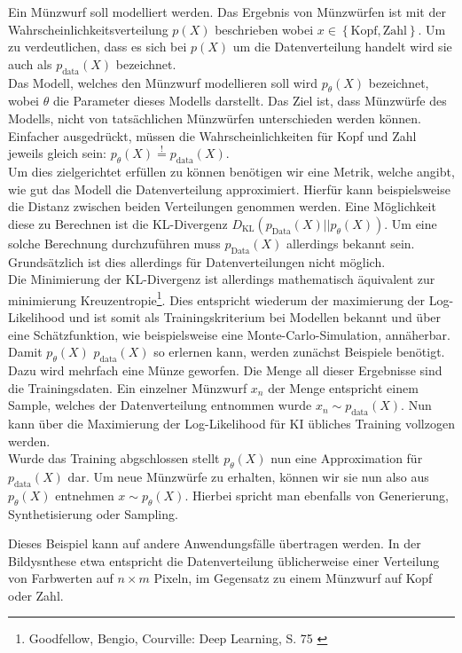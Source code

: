 Ein Münzwurf soll modelliert werden. Das Ergebnis von Münzwürfen ist mit der Wahrscheinlichkeitsverteilung $p(X)$ beschrieben wobei $x \in \left \{ \text{Kopf}, \text{Zahl} \right \}$. Um zu verdeutlichen, dass es sich bei $p(X)$ um die Datenverteilung handelt wird sie auch als $p_\text{data}(X)$ bezeichnet. \\
Das Modell, welches den Münzwurf modellieren soll wird $p_\theta(X)$ bezeichnet, wobei $\theta$ die Parameter dieses Modells darstellt. Das Ziel ist, dass Münzwürfe des Modells, nicht von tatsächlichen Münzwürfen unterschieden werden können. Einfacher ausgedrückt, müssen die Wahrscheinlichkeiten für Kopf und Zahl jeweils gleich sein: $p_\theta(X) \overset{!}{=} p_\text{data}(X)$. \\ 
Um dies zielgerichtet erfüllen zu können benötigen wir eine Metrik, welche angibt, wie gut das Modell die Datenverteilung approximiert. Hierfür kann beispielsweise die Distanz zwischen beiden Verteilungen genommen werden. Eine Möglichkeit diese zu Berechnen ist die KL-Divergenz $D_\text{KL}(p_\text{Data}(X)||p_\theta(X))$. Um eine solche Berechnung durchzuführen muss $p_\text{Data}(X)$ allerdings bekannt sein. Grundsätzlich ist dies allerdings für Datenverteilungen nicht möglich. \\
Die Minimierung der KL-Divergenz ist allerdings mathematisch äquivalent zur minimierung Kreuzentropie\footnote{
    Goodfellow, Bengio, Courville: Deep Learning, S. 75
    \cite{Goodfellow-et-al-2016}
}. 
Dies entspricht wiederum der maximierung der Log-Likelihood und ist somit als Trainingskriterium bei Modellen bekannt und über eine Schätzfunktion, wie beispielsweise eine Monte-Carlo-Simulation, annäherbar.
Damit $p_\theta(X)$ $p_\text{data}(X)$ so erlernen kann, werden zunächst Beispiele benötigt. Dazu wird mehrfach eine Münze geworfen. Die Menge all dieser Ergebnisse sind die Trainingsdaten. Ein einzelner Münzwurf $x_n$ der Menge entspricht einem Sample, welches der Datenverteilung entnommen wurde $x_n \sim p_\text{data}(X)$. Nun kann über die Maximierung der Log-Likelihood für \ac{KI} übliches Training vollzogen werden. \\
Wurde das Training abgschlossen stellt $p_\theta(X)$ nun eine Approximation für $p_\text{data}(X)$ dar. Um neue Münzwürfe zu erhalten, können wir sie nun also aus $p_\theta(X)$ entnehmen $x \sim p_\theta(X)$. Hierbei spricht man ebenfalls von Generierung, Synthetisierung oder Sampling.

Dieses Beispiel kann auf andere Anwendungsfälle übertragen werden. In der Bildysnthese etwa entspricht die Datenverteilung üblicherweise einer Verteilung von Farbwerten auf $n \times m$ Pixeln, im Gegensatz zu einem Münzwurf auf Kopf oder Zahl.


